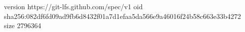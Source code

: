 version https://git-lfs.github.com/spec/v1
oid sha256:082df6fd09ad9fb6d8432f01a7d1efaa5da566e9a46016f24b58c663e33b4272
size 2796364
